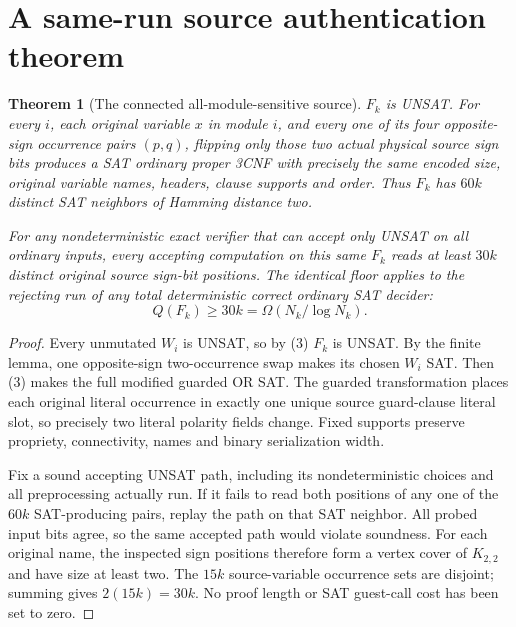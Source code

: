 \documentclass[11pt]{article}
\newtheorem{theorem}{Theorem}
\begin{document}
\section{A same-run source authentication theorem}
\begin{theorem}[The connected all-module-sensitive source]
$F_k$ is UNSAT. For every $i$, each original variable
$x$ in module $i$, and every one of its four opposite-sign
occurrence pairs $(p,q)$, flipping only those \emph{two actual
physical source sign bits} produces a SAT ordinary proper
3CNF with precisely the same encoded size, original variable
names, headers, clause supports and order.
Thus $F_k$ has $60k$ distinct SAT neighbors of Hamming distance two.

For any nondeterministic exact verifier that can accept only
UNSAT on \emph{all ordinary inputs}, every accepting computation
on this same $F_k$ reads at least $30k$ distinct original
source sign-bit positions. The identical floor applies to the
rejecting run of any total deterministic correct ordinary
SAT decider:
\[
\boxed{Q(F_k)\ge 30k=\Omega(N_k/\log N_k).}
\tag{5}
\]
\end{theorem}
\begin{proof}
Every unmutated $W_i$ is UNSAT, so by (3) $F_k$
is UNSAT. By the finite lemma, one opposite-sign
two-occurrence swap makes its chosen $W_i$ SAT.
Then (3) makes the full modified guarded OR SAT.
The guarded transformation places each original literal
occurrence in exactly one unique source guard-clause literal
slot, so precisely two literal polarity fields change.
Fixed supports preserve propriety, connectivity, names
and binary serialization width.

Fix a sound accepting UNSAT path, including its
nondeterministic choices and all preprocessing actually run.
If it fails to read both positions of any one of the $60k$
SAT-producing pairs, replay the path on that SAT neighbor.
All probed input bits agree, so the same accepted path
would violate soundness. For each original name,
the inspected sign positions therefore form a
vertex cover of $K_{2,2}$ and have size at least two.
The $15k$ source-variable occurrence sets are disjoint;
summing gives $2(15k)=30k$. No proof length
or SAT guest-call cost has been set to zero.
\end{proof}
\end{document}
